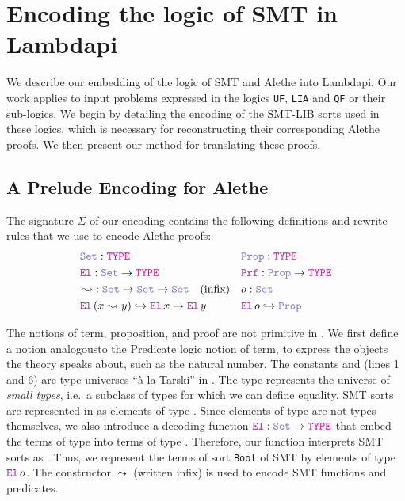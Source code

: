 
\section{Encoding the logic of SMT in Lambdapi}
\label{sect:encoding}

We describe our embedding of the logic of SMT and Alethe into Lambdapi.
Our work applies to input problems expressed in the logics \texttt{UF}, \texttt{LIA} and \texttt{QF} or their sub-logics.
We begin by detailing the encoding of the SMT-LIB sorts used in these logics, which is necessary for reconstructing their corresponding Alethe proofs.
We then present our method for translating these proofs.

\subsection{A Prelude Encoding for Alethe}
\label{sec:encoding-prelude}

\begin{definition}
\label{def:defuniv}
The signature $\Sigma$ of our encoding contains the following definitions and rewrite rules that we use to encode Alethe proofs:
\begin{align*}
&\set\index{\set}: \type & &\prop\index{\prop}: \type \\
&\index{\el{}} \el{}: \set \rightarrow \type  & &\index{\prf}\prf{} : \prop \rightarrow \type \\
&\mathop{\leadsto}\index{$\leadsto$}: \set \rightarrow \set \rightarrow \set \quad \text{(infix)} & &o: \set \\
&\el\,(x \leadsto y) \hookrightarrow \el\,x \rightarrow \el\,y & &\el\,o\index{o}  \hookrightarrow \prop
\end{align*}
\end{definition}

The notions of term, proposition, and proof are not primitive in \lpm.
We ﬁrst deﬁne a notion analogousto the Predicate logic notion of term, to express the objects the theory speaks about, such as the natural number.
The constants \set{} and \prop{} (lines 1 and 6) are type universes ``à la Tarski'' \cite[\S Universes]{intuitype} in \lpm.
The type \set{} represents the universe of \textit{small types}, i.e.\ a subclass of types for which we can define equality.
SMT sorts are represented in \lpm{} as elements of type \set{}. Since elements of type \set{} are not types themselves, 
we also introduce a decoding function $\el: \set \rightarrow \type$ that  embed the terms of type \set{} into terms of type \type.
Therefore, our function \el{} interprets SMT sorts as \type.
Thus, we represent the terms of sort \lstinline[language=SMT,basicstyle=\ttfamily\normalsize]|Bool| of SMT by elements of type $\el{}\,o$.
The constructor $\leadsto$ (written infix) is used to encode SMT functions and predicates.

